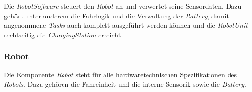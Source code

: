 Die \emph{RobotSoftware} steuert den \emph{Robot} an und verwertet seine Sensordaten. Dazu geh\"{o}rt unter anderem die Fahrlogik und die Verwaltung der \emph{Battery}, damit angenommene \emph{Tasks} auch komplett ausgef\"{u}hrt werden k\"{o}nnen und die \emph{RobotUnit} rechtzeitig die \emph{ChargingStation} erreicht.

\subsubsection{Robot}

Die Komponente \emph{Robot} steht f\"{u}r alle hardwaretechnischen Spezifikationen des \emph{Robots}. Dazu geh\"{o}ren die Fahreinheit und die interne Sensorik sowie die \emph{Battery}.
